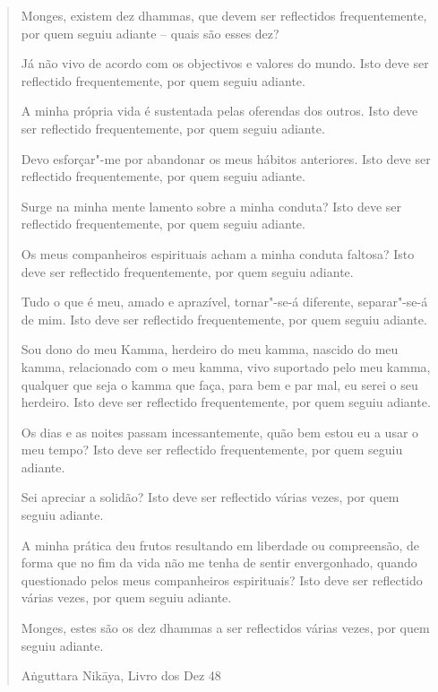 \begin{verse}

Monges, existem dez dhammas, que devem ser reflectidos
frequentemente, por quem seguiu adiante -- quais são esses dez?

Já não vivo de acordo com os objectivos e valores do mundo. Isto
deve ser reflectido frequentemente, por quem seguiu adiante.

A minha própria vida é sustentada pelas oferendas dos outros. Isto
deve ser reflectido frequentemente, por quem seguiu adiante.

Devo esforçar"-me por abandonar os meus hábitos anteriores. Isto
deve ser reflectido frequentemente, por quem seguiu adiante.

Surge na minha mente lamento sobre a minha conduta? Isto deve ser
reflectido frequentemente, por quem seguiu adiante.

Os meus companheiros espirituais acham a minha conduta faltosa?
Isto deve ser reflectido frequentemente, por quem seguiu adiante.

Tudo o que é meu, amado e aprazível, tornar"-se-á diferente,
separar"-se-á de mim. Isto deve ser reflectido frequentemente, por quem
seguiu adiante.

Sou dono do meu Kamma, herdeiro do meu kamma, nascido do meu
kamma, relacionado com o meu kamma, vivo suportado pelo meu kamma,
qualquer que seja o kamma que faça, para bem e par mal, eu serei o seu
herdeiro. Isto deve ser reflectido frequentemente, por quem seguiu
adiante.

\enlargethispage{\baselineskip}

Os dias e as noites passam incessantemente, quão bem estou eu a
usar o meu tempo? Isto deve ser reflectido frequentemente, por quem
seguiu adiante.

Sei apreciar a solidão? Isto deve ser reflectido várias vezes, por
quem seguiu adiante.

A minha prática deu frutos resultando em liberdade ou compreensão,
de forma que no fim da vida não me tenha de sentir envergonhado, quando
questionado pelos meus companheiros espirituais? Isto deve ser
reflectido várias vezes, por quem seguiu adiante.

Monges, estes são os dez dhammas a ser reflectidos várias vezes,
por quem seguiu adiante.

{\raggedleft
Aṅguttara Nikāya, Livro dos Dez 48
\par}

\end{verse}

